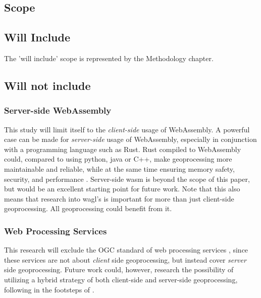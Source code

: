 \subsection{Scope}


\subsection*{Will Include}

The 'will include' scope is represented by the Methodology chapter. 

\subsection*{Will not include}

\subsubsection*{Server-side WebAssembly} %

This study will limit itself to the \emph{client-side} usage of WebAssembly. 
A powerful case can be made for \emph{server-side} usage of WebAssembly, especially in conjunction with a programming language such as Rust. 
Rust compiled to WebAssembly could, compared to using python, java or C++, make geoprocessing more maintainable and reliable, while at the same time ensuring memory safety, security, and performance \cite{clack_standardizing_2019}. 
Server-side wasm is beyond the scope of this paper, but would be an excellent starting point for future work. Note that this also means that research into \ac{wagl}'s is important for more than just client-side geoprocessing. All geoprocessing could benefit from it.



\subsubsection*{Web Processing Services} %


This research will exclude the OGC standard of web processing services \cite{ogc_web_2015}, since these services are not about \emph{client} side geoprocessing, but instead cover \emph{server} side geoprocessing. 
Future work could, however, research the possibility of utilizing a hybrid strategy of both client-side and server-side geoprocessing, following in the footsteps of \cite{panidi_hybrid_2015}. 



